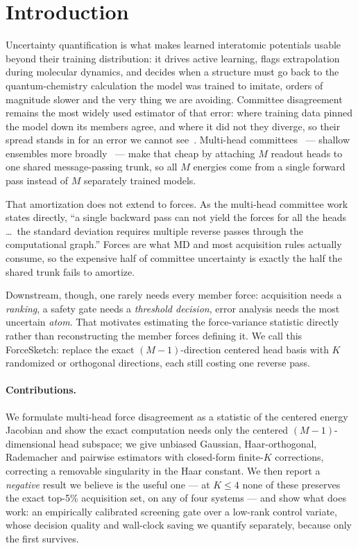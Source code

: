 \documentclass{article}
\begin{document}
\section{Introduction}
Uncertainty quantification is what makes learned interatomic potentials usable beyond their training
distribution: it drives active learning, flags extrapolation during molecular dynamics, and decides
when a structure must go back to the quantum-chemistry calculation the model was trained to imitate,
orders of magnitude slower and the very thing we are avoiding. Committee disagreement remains the
most widely used estimator of that error: where training data pinned the model down its members
agree, and where it did not they diverge, so their spread stands in for an error we cannot
see~\citep{behler2015,podryabinkin2017,carrete2023}. Multi-head
committees~\citep{beck2025mhc} --- shallow ensembles more broadly~\citep{kellner2024} --- make that
cheap by attaching $M$ readout heads to one shared message-passing trunk, so all $M$ energies come
from a single forward pass instead of $M$ separately trained models.

That amortization does not extend to forces. As the multi-head committee work states directly, ``a
single backward pass can not yield the forces for all the heads \ldots\ the standard deviation
requires multiple reverse passes through the computational graph.'' Forces are what MD and most
acquisition rules actually consume, so the expensive half of committee uncertainty is exactly the
half the shared trunk fails to amortize.

Downstream, though, one rarely needs every member force: acquisition needs a \emph{ranking}, a safety
gate needs a \emph{threshold decision}, error analysis needs the most uncertain \emph{atom}. That
motivates estimating the force-variance statistic directly rather than reconstructing the member
forces defining it. We call this ForceSketch: replace the exact $(M{-}1)$-direction centered head
basis with $K$ randomized or orthogonal directions, each still costing one reverse pass.

\paragraph{Contributions.}
We formulate multi-head force disagreement as a statistic of the centered energy Jacobian and show
the exact computation needs only the centered $(M{-}1)$-dimensional head subspace; we give unbiased
Gaussian, Haar-orthogonal, Rademacher and pairwise estimators with closed-form finite-$K$
corrections, correcting a removable singularity in the Haar constant. We then report a
\emph{negative} result we believe is the useful one --- at $K\le4$ none of these preserves the exact
top-5\% acquisition set, on any of four systems --- and show what does work: an empirically
calibrated screening gate over a low-rank control variate, whose decision quality and wall-clock
saving we quantify separately, because only the first survives.
\end{document}

